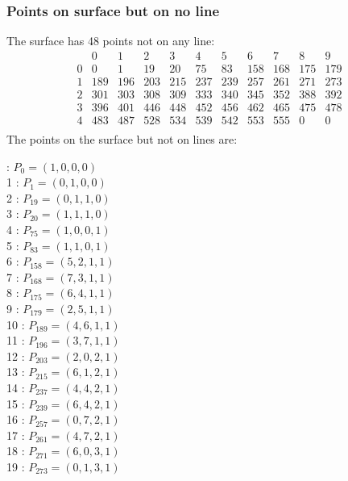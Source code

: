 \documentclass{article}
\begin{document}
{\subsubsection*{Points on surface but on no line}
The surface has 48 points not on any line:\\
$$
\begin{array}{r|*{10}{r}}
 & 0 & 1 & 2 & 3 & 4 & 5 & 6 & 7 & 8 & 9\\
\hline
0 & 0 & 1 & 19 & 20 & 75 & 83 & 158 & 168 & 175 & 179\\
1 & 189 & 196 & 203 & 215 & 237 & 239 & 257 & 261 & 271 & 273\\
2 & 301 & 303 & 308 & 309 & 333 & 340 & 345 & 352 & 388 & 392\\
3 & 396 & 401 & 446 & 448 & 452 & 456 & 462 & 465 & 475 & 478\\
4 & 483 & 487 & 528 & 534 & 539 & 542 & 553 & 555 & 0 & 0\\
\end{array}
$$
The points on the surface but not on lines are:\\
\begin{multicols}{2}
 : $P_{0}=( 1, 0, 0, 0 )$\\
1 : $P_{1}=( 0, 1, 0, 0 )$\\
2 : $P_{19}=( 0, 1, 1, 0 )$\\
3 : $P_{20}=( 1, 1, 1, 0 )$\\
4 : $P_{75}=( 1, 0, 0, 1 )$\\
5 : $P_{83}=( 1, 1, 0, 1 )$\\
6 : $P_{158}=( 5, 2, 1, 1 )$\\
7 : $P_{168}=( 7, 3, 1, 1 )$\\
8 : $P_{175}=( 6, 4, 1, 1 )$\\
9 : $P_{179}=( 2, 5, 1, 1 )$\\
10 : $P_{189}=( 4, 6, 1, 1 )$\\
11 : $P_{196}=( 3, 7, 1, 1 )$\\
12 : $P_{203}=( 2, 0, 2, 1 )$\\
13 : $P_{215}=( 6, 1, 2, 1 )$\\
14 : $P_{237}=( 4, 4, 2, 1 )$\\
15 : $P_{239}=( 6, 4, 2, 1 )$\\
16 : $P_{257}=( 0, 7, 2, 1 )$\\
17 : $P_{261}=( 4, 7, 2, 1 )$\\
18 : $P_{271}=( 6, 0, 3, 1 )$\\
19 : $P_{273}=( 0, 1, 3, 1 )$\\

\end{multicols}}
\end{document}
